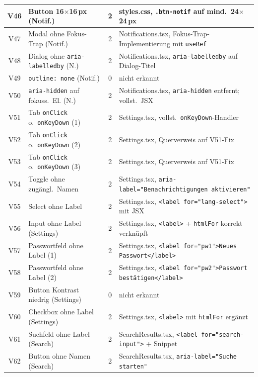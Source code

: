 \begin{longtable}{|c|p{5.0cm}|c|p{5.4cm}|}
V46  & Button 16$\times$16\,px (Notif.)             & 2 & styles.css, \texttt{.btn-notif} auf mind.\ 24$\times$24\,px \\ \hline
V47  & Modal ohne Fokus-Trap (Notif.)               & 2 & Notifications.tsx, Fokus-Trap-Implementierung mit \texttt{useRef} \\ \hline
V48  & Dialog ohne \texttt{aria-labelledby} (N.)    & 2 & Notifications.tsx, \texttt{aria-labelledby} auf Dialog-Titel \\ \hline
V49  & \texttt{outline: none} (Notif.)              & 0 & nicht erkannt \\ \hline
V50  & \texttt{aria-hidden} auf fokuss.\ El. (N.)   & 2 & Notifications.tsx, \texttt{aria-hidden} entfernt; vollst.\ JSX \\ \hline
V51  & Tab \texttt{onClick} o.\ \texttt{onKeyDown} (1) & 2 & Settings.tsx, vollst.\ \texttt{onKeyDown}-Handler \\ \hline
V52  & Tab \texttt{onClick} o.\ \texttt{onKeyDown} (2) & 2 & Settings.tsx, Querverweis auf V51-Fix \\ \hline
V53  & Tab \texttt{onClick} o.\ \texttt{onKeyDown} (3) & 2 & Settings.tsx, Querverweis auf V51-Fix \\ \hline
V54  & Toggle ohne zugängl.\ Namen                 & 2 & Settings.tsx, \texttt{aria-label="Benachrichtigungen aktivieren"} \\ \hline
V55  & Select ohne Label                            & 2 & Settings.tsx, \texttt{<label for="lang-select">} mit JSX \\ \hline
V56  & Input ohne Label (Settings)                  & 2 & Settings.tsx, \texttt{<label>} + \texttt{htmlFor} korrekt verknüpft \\ \hline
V57  & Passwortfeld ohne Label (1)                  & 2 & Settings.tsx, \texttt{<label for="pw1">Neues Passwort</label>} \\ \hline
V58  & Passwortfeld ohne Label (2)                  & 2 & Settings.tsx, \texttt{<label for="pw2">Passwort bestätigen</label>} \\ \hline
V59  & Button Kontrast niedrig (Settings)           & 0 & nicht erkannt \\ \hline
V60  & Checkbox ohne Label (Settings)               & 2 & Settings.tsx, \texttt{<label>} mit \texttt{htmlFor} ergänzt \\ \hline
V61  & Suchfeld ohne Label (Search)                 & 2 & SearchResults.tsx, \texttt{<label for="search-input">} + Snippet \\ \hline
V62  & Button ohne Namen (Search)                   & 2 & SearchResults.tsx, \texttt{aria-label="Suche starten"} \\ \hline

\end{longtable}
